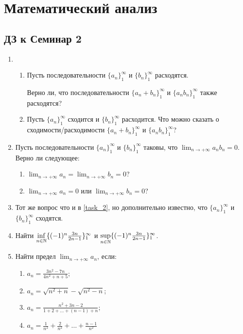 \documentclass[a4paper]{article}
\begin{document}
    \section*{Математический анализ}
    \subsection*{ДЗ к Семинар 2}
    
    \begin{enumerate}
    \item 
        \begin{enumerate}[label=\alph*)]
        \item 
            Пусть последовательности $\{a_n\}_1^\infty$ и $\{b_n\}_1^\infty$ расходятся.

            Верно ли, что последовательности $\{a_n + b_n\}_1^\infty$ и $\{a_n b_n\}_1^\infty$ также расходятся?
        \item
            Пусть $\{a_n\}_1^\infty$ сходится и $\{b_n\}_1^\infty$ расходится. Что можно сказать о сходимости/расходимости $\{a_n + b_n\}_1^\infty$ и $\{a_n b_n\}_1^\infty$?
        \end{enumerate}
    \item
        \label{task_2}
        Пусть последовательности $\{a_n\}_1^\infty$ и $\{b_n\}_1^\infty$ таковы, что $\lim_{n \to +\infty} a_n b_n = 0$. Верно ли следующее:
        \begin{enumerate}[label=\alph*)]
        \item
            $\lim_{n \to +\infty} a_n = \lim_{n \to +\infty} b_n = 0$?
        \item
            $\lim_{n \to +\infty} a_n = 0$ или $\lim_{n \to +\infty} b_n = 0$?
        \end{enumerate}

    \item
        Тот же вопрос что и в \ref{task_2}, но дополнительно известно, что $\{a_n\}_1^\infty$ и $\{b_n\}_1^\infty$ сходятся.

    \item
        Найти $\underset{n \in \mathbb{N}}{\inf} \{(-1)^n \frac{3n}{2n - 1}\}_1^\infty$ и $\underset{n \in \mathbb{N}}{\sup} \{(-1)^n \frac{3n}{2n - 1}\}_1^\infty$.

    \item
        Найти предел $\lim_{n \to +\infty} a_n$, если:

        \begin{enumerate}[label=\alph*)]
        \item
            $a_n = \frac{3n^2 - 7n}{4n^2 + n + 5}$;
        \item
            $a_n = \sqrt{n^2 + n} - \sqrt{n^2 - n}$;
        \item
            $a_n = \frac{n^2 + 3n - 2}{1 + 2 + \dots + (n - 1) + n}$;
        \item
            $a_n = \frac{1}{n^2} + \frac{2}{n^2} + \dots + \frac{n - 1}{n^2}$


\end{enumerate}
\end{enumerate}
\end{document}

